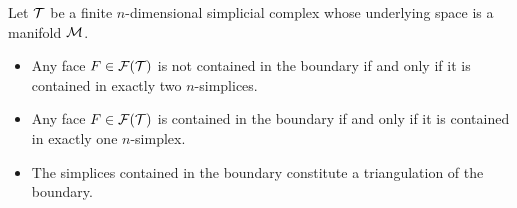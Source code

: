 \documentclass[a4paper]{article}
\begin{document}
\begin{lemma}\label{lemma:boundarysimplices}
    Let ${\mathcal T}$ be a finite $n$-dimensional simplicial complex whose underlying space is a manifold ${\mathcal M}$. 
    \begin{itemize}
        \item Any face $F \in {\mathcal F}({\mathcal T})$ is not contained in the boundary if and only if it is contained in exactly two $n$-simplices.
        \item Any face $F \in {\mathcal F}({\mathcal T})$ is contained in the boundary if and only if it is contained in exactly one $n$-simplex.
        \item The simplices contained in the boundary constitute a triangulation of the boundary.
    \end{itemize}
\end{lemma}
\end{document}
